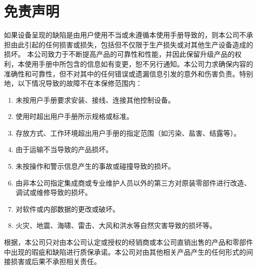 \section{免责声明}
如果设备呈现的缺陷是由用户使用不当或未遵循本使用手册导致的，则本公司不承担由此引起的任何损害或损失，包括但不仅限于生产损失或对其他生产设备造成的损坏。
本公司致力于不断提高产品的可靠性和性能，并因此保留升级产品的权利，本使用手册中所包含的信息如有变更，恕不另行通知。本公司力求确保{\ThisBook}内容的准确性和可靠性，但不对其中的任何错误或遗漏信息引发的意外和伤害负责。特别地，以下情况导致的故障不在本保修范围内：
\begin{enumerate}
\item 未按用户手册要求安装、接线、连接其他控制设备。
\item 使用时超出用户手册所示规格或标准。
\item 存放方式、工作环境超出用户手册的指定范围（如污染、盐害、结露等）。
\item 由于运输不当导致的产品损坏。
\item 未按操作和警示信息产生的事故或碰撞导致的损坏。
\item 由非本公司指定集成商或专业维护人员以外的第三方对原装零部件进行改造、调试或维修导致的损坏。
\item 对软件或内部数据的更改或破坏。
\item 火灾、地震、海啸、雷击、大风和洪水等自然灾害导致的损坏等。
\end{enumerate}

根据{\TheSec}，本公司只对由本公司认定或授权的经销商或本公司直销出售的产品和零部件中出现的瑕疵和缺陷进行质保承诺。本公司对由其他相关产品产生的任何形式的间接损害或后果不承担相关责任。
